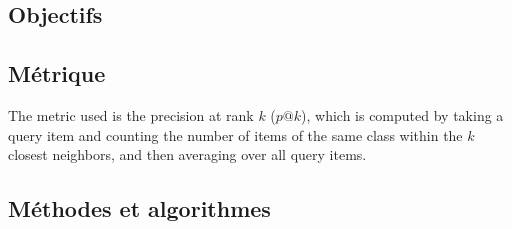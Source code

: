 \subsection{Objectifs}
\label{sec:ch6_objASSR}


\subsection{Métrique}
\label{sec:ch6_metriqueASSR}

The metric used is the precision at rank $k$ ($p@k$), which is computed by taking a query item and counting the number of items of the same class within the $k$ closest neighbors, and then averaging over all query items. 

\subsection{Méthodes et algorithmes}
\label{sec:ch6_algoASSR}








